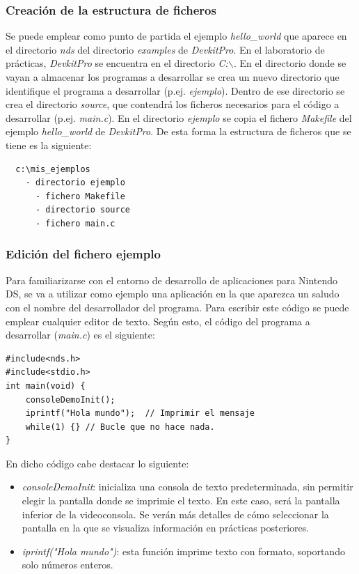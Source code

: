 \subsubsection{Creación de la estructura de ficheros}
Se puede emplear como punto de partida el ejemplo  \textit{hello\_world} que aparece en el directorio \textit{nds} del directorio \textit{examples} de  \textit{DevkitPro}. En  el laboratorio de prácticas, \textit{DevkitPro} se encuentra en el directorio \textit{C:$\backslash$}. En el directorio donde se vayan a almacenar los  programas a desarro\-llar se crea un nuevo directorio que identifique el programa a desarrollar (p.ej. \textit{ejemplo}). Dentro de ese directorio se crea el directorio \textit{source}, que contendrá los ficheros necesarios para el código a desarrollar (p.ej. \textit{main.c}). En el directorio \textit{ejemplo} se copia el fichero \textit{Makefile} del  ejemplo  \textit{hello\_world} de \textit{DevkitPro}. De esta forma la estructura de ficheros que se tiene es la siguiente:

{\scriptsize
 \begin{verbatim}
  c:\mis_ejemplos
    - directorio ejemplo
      - fichero Makefile
      - directorio source
      - fichero main.c
\end{verbatim}
}

\subsubsection{Edición del fichero ejemplo}
Para familiarizarse con el entorno de desarrollo de aplicaciones para Nintendo DS, se va a utilizar como ejemplo una aplicación en la que aparezca un saludo con el nombre del desarrollador del programa. Para escribir este código se puede emplear cualquier editor de texto. Según esto, el código del programa a desarrollar (\textit{main.c}) es el siguiente:

\begin{lstlisting}
#include<nds.h>
#include<stdio.h>
int main(void) {
    consoleDemoInit();
    iprintf("Hola mundo");  // Imprimir el mensaje 
    while(1) {} // Bucle que no hace nada.     
}
\end{lstlisting}

En dicho código cabe destacar lo siguiente:
\begin{itemize}
\item \textit{consoleDemoInit}: inicializa una consola de texto predeterminada, sin permitir elegir la pantalla donde se imprimie el texto. En este caso, será la pantalla inferior de la videoconsola. Se verán más detalles de cómo seleccionar la pantalla en la que se visualiza información en prácticas posteriores. 
%
\item  \textit{iprintf("Hola mundo")}: esta función imprime texto con formato, soportando solo números enteros.
\end{itemize}

